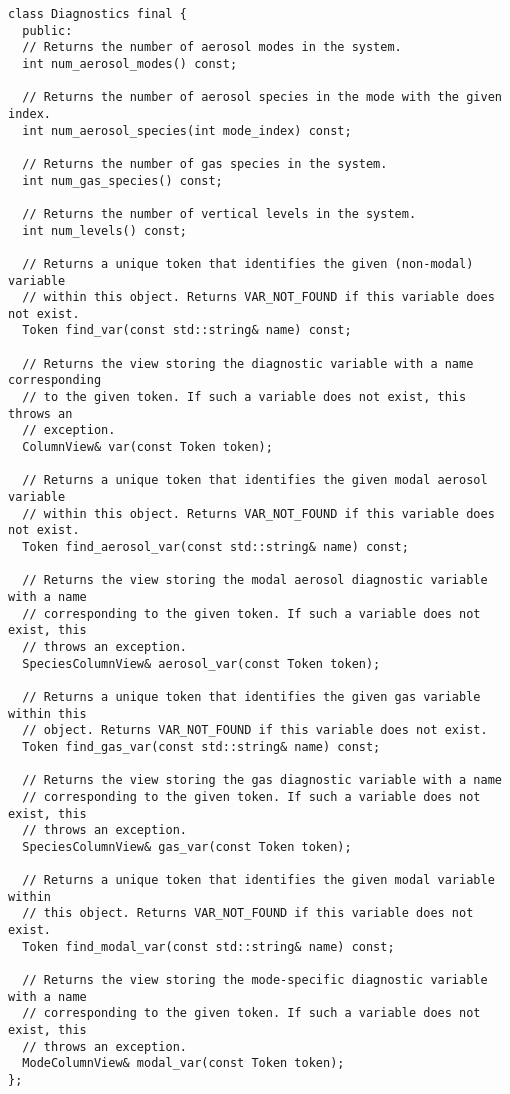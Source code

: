 \lstset{language=[11]c++}
\begin{lstlisting}
class Diagnostics final {
  public:
  // Returns the number of aerosol modes in the system.
  int num_aerosol_modes() const;

  // Returns the number of aerosol species in the mode with the given index.
  int num_aerosol_species(int mode_index) const;

  // Returns the number of gas species in the system.
  int num_gas_species() const;

  // Returns the number of vertical levels in the system.
  int num_levels() const;

  // Returns a unique token that identifies the given (non-modal) variable
  // within this object. Returns VAR_NOT_FOUND if this variable does not exist.
  Token find_var(const std::string& name) const;

  // Returns the view storing the diagnostic variable with a name corresponding
  // to the given token. If such a variable does not exist, this throws an
  // exception.
  ColumnView& var(const Token token);

  // Returns a unique token that identifies the given modal aerosol variable
  // within this object. Returns VAR_NOT_FOUND if this variable does not exist.
  Token find_aerosol_var(const std::string& name) const;

  // Returns the view storing the modal aerosol diagnostic variable with a name
  // corresponding to the given token. If such a variable does not exist, this
  // throws an exception.
  SpeciesColumnView& aerosol_var(const Token token);

  // Returns a unique token that identifies the given gas variable within this
  // object. Returns VAR_NOT_FOUND if this variable does not exist.
  Token find_gas_var(const std::string& name) const;

  // Returns the view storing the gas diagnostic variable with a name
  // corresponding to the given token. If such a variable does not exist, this
  // throws an exception.
  SpeciesColumnView& gas_var(const Token token);

  // Returns a unique token that identifies the given modal variable within
  // this object. Returns VAR_NOT_FOUND if this variable does not exist.
  Token find_modal_var(const std::string& name) const;

  // Returns the view storing the mode-specific diagnostic variable with a name
  // corresponding to the given token. If such a variable does not exist, this
  // throws an exception.
  ModeColumnView& modal_var(const Token token);
};
\end{lstlisting}

